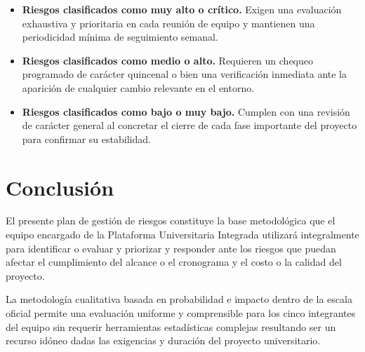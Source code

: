 \documentclass[11pt,spanish]{article}
\begin{document}
\begin{itemize}
    \item \textbf{Riesgos clasificados como muy alto o crítico.} Exigen una evaluación exhaustiva y prioritaria en cada reunión de equipo y mantienen una periodicidad mínima de seguimiento semanal.
    \item \textbf{Riesgos clasificados como medio o alto.} Requieren un chequeo programado de carácter quincenal o bien una verificación inmediata ante la aparición de cualquier cambio relevante en el entorno.
    \item \textbf{Riesgos clasificados como bajo o muy bajo.} Cumplen con una revisión de carácter general al concretar el cierre de cada fase importante del proyecto para confirmar su estabilidad.
\end{itemize}

\section{Conclusión}

El presente plan de gestión de riesgos constituye la base metodológica que el equipo encargado de la Plataforma Universitaria Integrada utilizará integralmente para identificar o evaluar y priorizar y responder ante los riesgos que puedan afectar el cumplimiento del alcance o el cronograma y el costo o la calidad del proyecto.

La metodología cualitativa basada en probabilidad e impacto dentro de la escala oficial permite una evaluación uniforme y comprensible para los cinco integrantes del equipo sin requerir herramientas estadísticas complejas resultando ser un recurso idóneo dadas las exigencias y duración del proyecto universitario.
\end{document}
